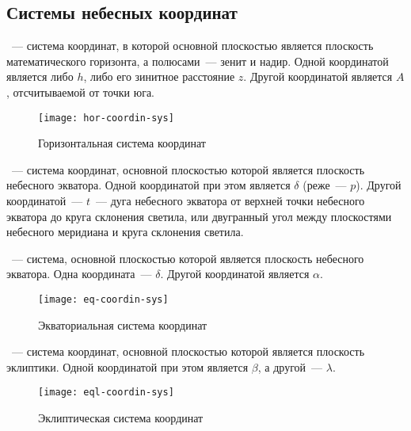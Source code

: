 \subsection{Системы небесных координат}
~--- система координат, в которой основной плоскостью является плоскость математического горизонта, а полюсами~--- зенит и надир. Одной координатой является либо  $h$, либо его {зинитное расстояние} $z$. Другой координатой является  $A$, отсчитываемой от точки юга.


\begin{figure}[!h]
\begin{center}
\texttt{[image: hor-coordin-sys]}
\caption{Горизонтальная система координат}
\end{center}
\end{figure}

~--- система координат, основной плоскостью которой является плоскость небесного экватора. Одной координатой при этом является  $\delta$ (реже~---  $p$). Другой координатой~---  $t$~--- дуга небесного экватора от верхней точки небесного экватора до круга склонения светила, или двугранный угол между плоскостями небесного меридиана и круга склонения светила.

~--- система, основной плоскостью которой является плоскость небесного экватора. Одна координата~---  $\delta$. Другой координатой является  $\alpha$.


\begin{figure}[!h]
\begin{center}
\texttt{[image: eq-coordin-sys]}
\caption{Экваториальная система координат}
\end{center}
\end{figure}

~--- система координат, основной плоскостью которой является плоскость эклиптики. Одной координатой при этом является  $\beta$, а другой~---  $\lambda$.

\begin{figure}[!h]
\begin{center}
\texttt{[image: eql-coordin-sys]}
\caption{Эклиптическая система координат}
\end{center}
\end{figure}

